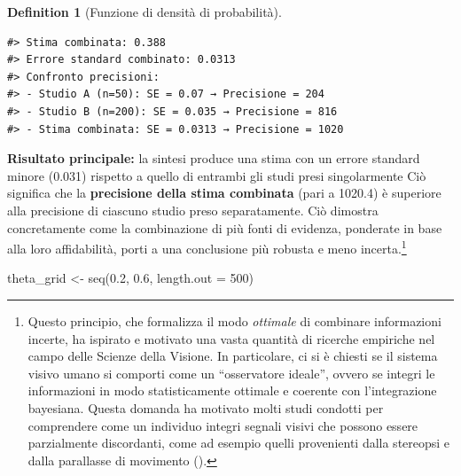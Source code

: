 \documentclass[
  letterpaper,
  DIV=11,
  numbers=noendperiod,
  oneside]{scrreprt}
\newenvironment{Shaded}{\begin{snugshade}}{\end{snugshade}}
\newcommand{\AttributeTok}[1]{\textcolor[rgb]{0.40,0.45,0.13}{#1}}
\newcommand{\CommentTok}[1]{\textcolor[rgb]{0.37,0.37,0.37}{#1}}
\newcommand{\DecValTok}[1]{\textcolor[rgb]{0.68,0.00,0.00}{#1}}
\newcommand{\FloatTok}[1]{\textcolor[rgb]{0.68,0.00,0.00}{#1}}
\newcommand{\FunctionTok}[1]{\textcolor[rgb]{0.28,0.35,0.67}{#1}}
\newcommand{\NormalTok}[1]{\textcolor[rgb]{0.00,0.23,0.31}{#1}}
\newcommand{\OtherTok}[1]{\textcolor[rgb]{0.00,0.23,0.31}{#1}}
\newcommand{\SpecialCharTok}[1]{\textcolor[rgb]{0.37,0.37,0.37}{#1}}
\theoremstyle{definition}
\theoremstyle{plain}
\theoremstyle{definition}
\newtheorem{definition}{Definition}[chapter]
\theoremstyle{remark}
\begin{document}
\begin{definition}[Funzione di densità di
probabilità]
\begin{Shaded}
\end{Shaded}

\begin{verbatim}
#> Stima combinata: 0.388
#> Errore standard combinato: 0.0313
#> Confronto precisioni:
#> - Studio A (n=50): SE = 0.07 → Precisione = 204
#> - Studio B (n=200): SE = 0.035 → Precisione = 816
#> - Stima combinata: SE = 0.0313 → Precisione = 1020
\end{verbatim}

\textbf{Risultato principale:} la sintesi produce una stima con un
errore standard minore (0.031) rispetto a quello di entrambi gli studi
presi singolarmente Ciò significa che la \textbf{precisione della stima
combinata} (pari a 1020.4) è superiore alla precisione di ciascuno
studio preso separatamente. Ciò dimostra concretamente come la
combinazione di più fonti di evidenza, ponderate in base alla loro
affidabilità, porti a una conclusione più robusta e meno
incerta.\footnote{Questo principio, che formalizza il modo
  \emph{ottimale} di combinare informazioni incerte, ha ispirato e
  motivato una vasta quantità di ricerche empiriche nel campo delle
  Scienze della Visione. In particolare, ci si è chiesti se il sistema
  visivo umano si comporti come un ``osservatore ideale'', ovvero se
  integri le informazioni in modo statisticamente ottimale e coerente
  con l'integrazione bayesiana. Questa domanda ha motivato molti studi
  condotti per comprendere come un individuo integri segnali visivi che
  possono essere parzialmente discordanti, come ad esempio quelli
  provenienti dalla stereopsi e dalla parallasse di movimento
  ().}

\begin{Shaded}
\begin{Highlighting}[]
\NormalTok{theta\_grid }\OtherTok{\textless{}{-}} \FunctionTok{seq}\NormalTok{(}\FloatTok{0.2}\NormalTok{, }\FloatTok{0.6}\NormalTok{, }\AttributeTok{length.out =} \DecValTok{500}\NormalTok{)}


\end{Highlighting}
\end{Shaded}
\end{definition}
\end{document}
